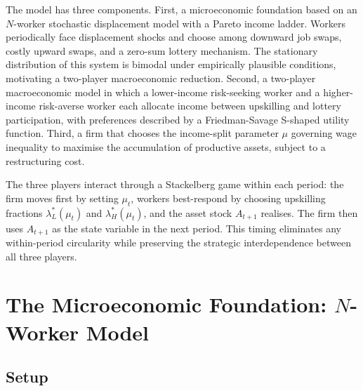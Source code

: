 \documentclass[12pt,a4paper]{article}
\begin{document}
The model has three components. First, a microeconomic foundation based on an
$N$-worker stochastic displacement model with a Pareto income ladder. Workers
periodically face displacement shocks and choose among downward job swaps,
costly upward swaps, and a zero-sum lottery mechanism. The stationary distribution
of this system is bimodal under empirically plausible conditions, motivating a
two-player macroeconomic reduction. Second, a two-player macroeconomic model
in which a lower-income risk-seeking worker and a higher-income risk-averse worker
each allocate income between upskilling and lottery participation, with
preferences described by a Friedman-Savage S-shaped utility function. Third,
a firm that chooses the income-split parameter $\mu$ governing wage inequality
to maximise the accumulation of productive assets, subject to a restructuring cost.

The three players interact through a Stackelberg game within each period: the
firm moves first by setting $\mu_t$, workers best-respond by choosing upskilling
fractions $\lambda_L^*(\mu_t)$ and $\lambda_H^*(\mu_t)$, and the asset stock
$A_{t+1}$ realises. The firm then uses $A_{t+1}$ as the state variable in the
next period. This timing eliminates any within-period circularity while preserving
the strategic interdependence between all three players.

\section{The Microeconomic Foundation: $N$-Worker Model}

\subsection{Setup}
\end{document}
